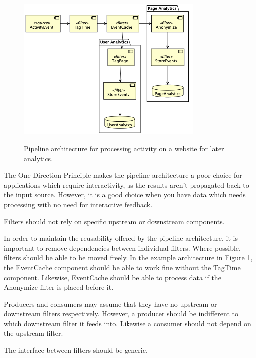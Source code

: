 \begin{figure}
    \centering
    \includegraphics[width=0.8\textwidth]{diagrams/activity-tracking.png}
    \label{fig:analytics}
    \caption{Pipeline architecture for processing activity on a website for later analytics.}
\end{figure}

The One Direction Principle makes the pipeline architecture a poor choice for applications which require interactivity,
as the results aren't propagated back to the input source.
However, it is a good choice when you have data which needs processing with no need for interactive feedback.

\begin{definition}\label{independent}
Filters should not rely on specific upstream or downstream components.
\end{definition}

In order to maintain the reusability offered by the pipeline architecture,
it is important to remove dependencies between individual filters.
Where possible, filters should be able to be moved freely.
In the example architecture in Figure \ref{fig:analytics},
the EventCache component should be able to work fine without
the TagTime component.
Likewise, EventCache should be able to process data if the
Anonymize filter is placed before it.

Producers and consumers may assume that they have no upstream or downstream filters respectively.
However, a producer should be indifferent to which downstream filter it feeds into.
Likewise a consumer should not depend on the upstream filter.

\begin{corollary}\label{interface}
The interface between filters should be generic.
\end{corollary}

